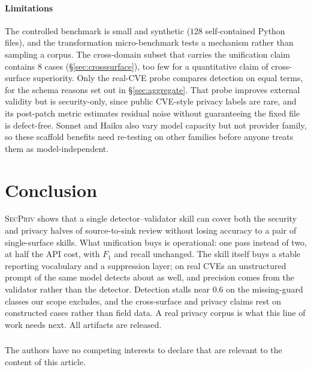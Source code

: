 \documentclass[runningheads]{llncs}
\begin{document}
\paragraph{Limitations} The controlled benchmark is small and synthetic ($128$ self-contained Python files), and the transformation micro-benchmark tests a mechanism rather than sampling a corpus. The cross-domain subset that carries the unification claim contains $8$ cases (\S\ref{sec:crosssurface}), too few for a quantitative claim of cross-surface superiority. Only the real-CVE probe compares detection on equal terms, for the schema reasons set out in \S\ref{sec:aggregate}. That probe improves external validity but is security-only, since public CVE-style privacy labels are rare, and its post-patch metric estimates residual noise without guaranteeing the fixed file is defect-free. Sonnet and Haiku also vary model capacity but not provider family, so these scaffold benefits need re-testing on other families before anyone treats them as model-independent.

\section{Conclusion}

\textsc{SecPriv} shows that a single detector--validator skill can cover both the security and privacy halves of source-to-sink review without losing accuracy to a pair of single-surface skills. What unification buys is operational: one pass instead of two, at half the API cost, with $F_1$ and recall unchanged. The skill itself buys a stable reporting vocabulary and a suppression layer; on real CVEs an unstructured prompt of the same model detects about as well, and precision comes from the validator rather than the detector. Detection stalls near $0.6$ on the missing-guard classes our scope excludes, and the cross-surface and privacy claims rest on constructed cases rather than field data. A real privacy corpus is what this line of work needs next. All artifacts are released.

\begin{credits}
\subsubsection{\discintname}
The authors have no competing interests to declare that are
relevant to the content of this article.
\end{credits}
\end{document}
